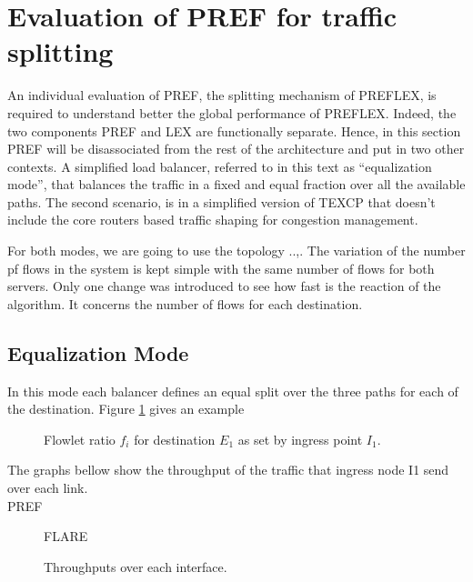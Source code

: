 \section{Evaluation of PREF for traffic splitting}

An individual evaluation of PREF, the splitting mechanism of PREFLEX, is required to understand better the global performance of PREFLEX. Indeed, the two components PREF and LEX are functionally separate. Hence, in this section PREF will be disassociated from the rest of the architecture and put in two other contexts. A simplified load balancer, referred to in this text as “equalization mode”, that balances the traffic in a fixed and equal fraction over all the available paths. The second scenario, is in a simplified version of TEXCP that doesn't include the core routers based traffic shaping for congestion management. 

For both modes, we are going to use the topology ..,. The variation of the number pf flows in the system is kept simple with the same number of flows for both servers. Only one change was introduced to see how fast is the reaction of the algorithm. It concerns the number of flows for each destination.

\subsection{Equalization Mode}

In this mode each balancer defines an equal split over the three paths for each of the destination. Figure \ref{fig:fwnd} gives an example

 \begin{figure}[h]
  \begin{center}
\caption{
  Flowlet ratio $f_{i}$ for destination $E_{1}$ as set by ingress point $I_{1}$.
    \label{fig:fwnd}
}
 \end{center}
\end{figure}

The graphs bellow show the throughput of the traffic that ingress node I1 send over each link.\\

PREF

\begin{figure}[h]
 \begin{center}

\caption{
  Throughputs over each interface.
    \label{fig:equal-thro-pref}
}
\end{center}

FLARE

\end{figure}

